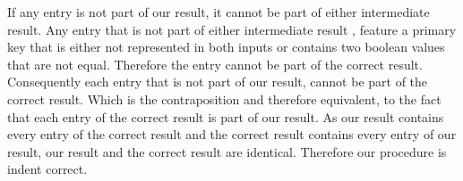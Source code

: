 If any entry is not part of our result, it cannot be part of either intermediate result. Any entry that is not part of either intermediate result , feature a primary key that is either not represented in both inputs or contains two boolean values that are not equal.
Therefore the entry cannot be part of the correct result. Consequently each entry that is not part of our result, cannot be part of the correct result. Which is the contraposition and therefore equivalent, to the fact that each entry of the correct result is part of our result. 
As our result contains every entry of the correct result and the correct result contains every entry of our result, our result and the correct result are identical. Therefore our procedure is indent correct.



